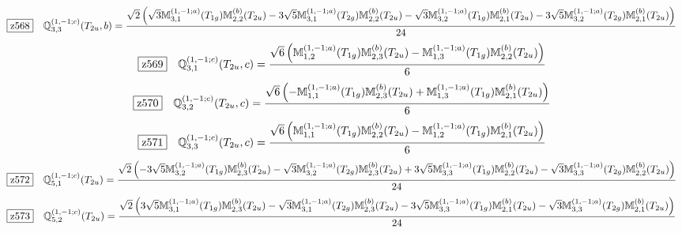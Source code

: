 \documentclass[fleqn,10pt,landscape]{jsarticle}
\begin{document}
\begin{dmath*}
\hspace*{3mm}\fbox{z568}\quad \mathbb{Q}_{3,3}^{(1,-1;c)}(T_{2u},b)=\frac{\sqrt{2} \left(\sqrt{3} \mathbb{M}_{3,1}^{(1,-1;a)}(T_{1g}) \mathbb{M}_{2,2}^{(b)}(T_{2u}) - 3 \sqrt{5} \mathbb{M}_{3,1}^{(1,-1;a)}(T_{2g}) \mathbb{M}_{2,2}^{(b)}(T_{2u}) - \sqrt{3} \mathbb{M}_{3,2}^{(1,-1;a)}(T_{1g}) \mathbb{M}_{2,1}^{(b)}(T_{2u}) - 3 \sqrt{5} \mathbb{M}_{3,2}^{(1,-1;a)}(T_{2g}) \mathbb{M}_{2,1}^{(b)}(T_{2u})\right)}{24}
\end{dmath*}
\begin{dmath*}
\hspace*{3mm}\fbox{z569}\quad \mathbb{Q}_{3,1}^{(1,-1;c)}(T_{2u},c)=\frac{\sqrt{6} \left(\mathbb{M}_{1,2}^{(1,-1;a)}(T_{1g}) \mathbb{M}_{2,3}^{(b)}(T_{2u}) - \mathbb{M}_{1,3}^{(1,-1;a)}(T_{1g}) \mathbb{M}_{2,2}^{(b)}(T_{2u})\right)}{6}
\end{dmath*}
\begin{dmath*}
\hspace*{3mm}\fbox{z570}\quad \mathbb{Q}_{3,2}^{(1,-1;c)}(T_{2u},c)=\frac{\sqrt{6} \left(- \mathbb{M}_{1,1}^{(1,-1;a)}(T_{1g}) \mathbb{M}_{2,3}^{(b)}(T_{2u}) + \mathbb{M}_{1,3}^{(1,-1;a)}(T_{1g}) \mathbb{M}_{2,1}^{(b)}(T_{2u})\right)}{6}
\end{dmath*}
\begin{dmath*}
\hspace*{3mm}\fbox{z571}\quad \mathbb{Q}_{3,3}^{(1,-1;c)}(T_{2u},c)=\frac{\sqrt{6} \left(\mathbb{M}_{1,1}^{(1,-1;a)}(T_{1g}) \mathbb{M}_{2,2}^{(b)}(T_{2u}) - \mathbb{M}_{1,2}^{(1,-1;a)}(T_{1g}) \mathbb{M}_{2,1}^{(b)}(T_{2u})\right)}{6}
\end{dmath*}
\begin{dmath*}
\hspace*{3mm}\fbox{z572}\quad \mathbb{Q}_{5,1}^{(1,-1;c)}(T_{2u})=\frac{\sqrt{2} \left(- 3 \sqrt{5} \mathbb{M}_{3,2}^{(1,-1;a)}(T_{1g}) \mathbb{M}_{2,3}^{(b)}(T_{2u}) - \sqrt{3} \mathbb{M}_{3,2}^{(1,-1;a)}(T_{2g}) \mathbb{M}_{2,3}^{(b)}(T_{2u}) + 3 \sqrt{5} \mathbb{M}_{3,3}^{(1,-1;a)}(T_{1g}) \mathbb{M}_{2,2}^{(b)}(T_{2u}) - \sqrt{3} \mathbb{M}_{3,3}^{(1,-1;a)}(T_{2g}) \mathbb{M}_{2,2}^{(b)}(T_{2u})\right)}{24}
\end{dmath*}
\begin{dmath*}
\hspace*{3mm}\fbox{z573}\quad \mathbb{Q}_{5,2}^{(1,-1;c)}(T_{2u})=\frac{\sqrt{2} \left(3 \sqrt{5} \mathbb{M}_{3,1}^{(1,-1;a)}(T_{1g}) \mathbb{M}_{2,3}^{(b)}(T_{2u}) - \sqrt{3} \mathbb{M}_{3,1}^{(1,-1;a)}(T_{2g}) \mathbb{M}_{2,3}^{(b)}(T_{2u}) - 3 \sqrt{5} \mathbb{M}_{3,3}^{(1,-1;a)}(T_{1g}) \mathbb{M}_{2,1}^{(b)}(T_{2u}) - \sqrt{3} \mathbb{M}_{3,3}^{(1,-1;a)}(T_{2g}) \mathbb{M}_{2,1}^{(b)}(T_{2u})\right)}{24}
\end{dmath*}
\end{document}
